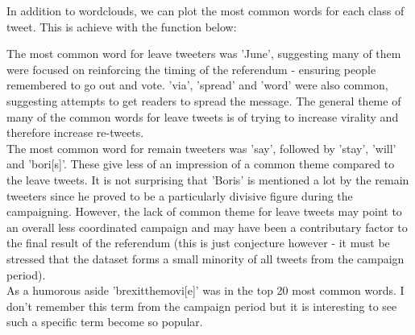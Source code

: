 \documentclass[10pt]{article}
\begin{document}
In addition to wordclouds, we can plot the most common words for each class of tweet. This is achieve with the function below:
\begin{Schunk}
\end{Schunk}
The most common word for leave tweeters was 'June', suggesting many of them were focused on reinforcing the timing of the referendum - ensuring people remembered to go out and vote. 'via', 'spread' and 'word' were also common, suggesting attempts to get readers to spread the message. The general theme of many of the common words for leave tweets is of trying to increase virality and therefore increase re-tweets.\\
The most common word for remain tweeters was 'say', followed by 'stay', 'will' and 'bori[s]'. These give less of an impression of a common theme compared to the leave tweets. It is not surprising that 'Boris' is mentioned a lot by the remain tweeters since he proved to be a particularly divisive figure during the campaigning. However, the lack of common theme for leave tweets may point to an overall less coordinated campaign and may have been a contributary factor to the final result of the referendum (this is just conjecture however - it must be stressed that the dataset forms a small minority of all tweets from the campaign period).\\
As a humorous aside 'brexitthemovi[e]' was in the top 20 most common words. I don't remember this term from the campaign period but it is interesting to see such a specific term become so popular.
\end{document}
